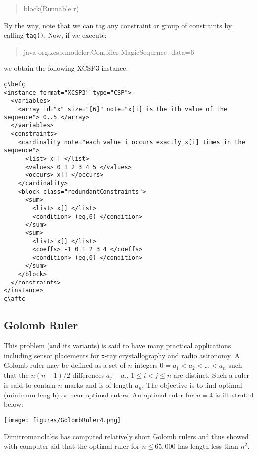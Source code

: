 \documentclass[10pt]{article}
\def\xt{{\rm XCSP3}\xspace}
\newcommand{\nn}[1]{{\tt #1}} %
\def\xt{{\rm XCSP3}\xspace}
\newenvironment{myvb}{\endgraf\small\verbatim}{\endverbatim}
\def\bef{\rule{10cm}{0.1mm}} %
\def\aft{\rule{10cm}{0.1mm}\medskip}
\begin{document}
\begin{quote}
\begin{myvb}
block(Runnable r) 
\end{myvb}
\end{quote}

By the way, note that we can tag any constraint or group of constraints by calling \nn{tag()}.
Now, if we execute:
\begin{quote}
\begin{myvb}
java org.xcsp.modeler.Compiler MagicSequence -data=6
\end{myvb}
\end{quote}
we obtain the following \xt instance:
\begin{lstlisting}
ç\befç
<instance format="XCSP3" type="CSP">
  <variables>
    <array id="x" size="[6]" note="x[i] is the ith value of the sequence"> 0..5 </array>
  </variables>
  <constraints>
    <cardinality note="each value i occurs exactly x[i] times in the sequence">
      <list> x[] </list>
      <values> 0 1 2 3 4 5 </values>
      <occurs> x[] </occurs>
    </cardinality>
    <block class="redundantConstraints">
      <sum>
        <list> x[] </list>
        <condition> (eq,6) </condition>
      </sum>
      <sum>
        <list> x[] </list>
        <coeffs> -1 0 1 2 3 4 </coeffs>
        <condition> (eq,0) </condition>
      </sum>
    </block>
  </constraints>
</instance>
ç\aftç
\end{lstlisting}

\subsection{Golomb Ruler}

This problem (and its variants) is said to have many practical applications including sensor placements for x-ray crystallography and radio astronomy. 
A Golomb ruler may be defined as a set of $n$ integers $0 = a_1 < a_2 < ... < a_n$ such that the $n(n-1)/2$ differences $a_j - a_i$, $1 \leq i < j \leq n$ are distinct. 
Such a ruler is said to contain $n$ marks and is of length $a_n$. 
The objective is to find optimal (minimum length) or near optimal rulers. 
An optimal ruler for $n=4$ is illustrated below:

\begin{center}
\texttt{[image: figures/GolombRuler4.png]} 
\end{center}

Dimitromanolakis has computed relatively short Golomb rulers
and thus showed with computer aid that the optimal ruler for $n \leq 65,000$ has length less than $n^2$.
\end{document}
